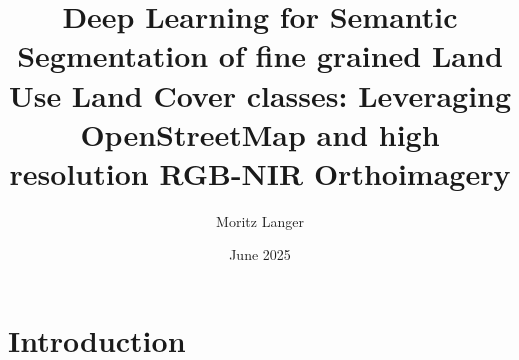 \documentclass{report}
\title{Deep Learning for Semantic Segmentation of fine grained Land Use Land Cover classes: Leveraging OpenStreetMap and high resolution RGB-NIR Orthoimagery}
\author{Moritz Langer}
\date{June 2025}
\begin{document}
\maketitle


\setcounter{tocdepth}{3} %

\tableofcontents

\clearpage

\listoffigures
\listoftables
\clearpage

\setcounter{page}{1}

\makeatletter
{} %
\renewcommand{\thesection}{\arabic{section}} %
\renewcommand{\thesubsection}{\thesection.\arabic{subsection}} %
\renewcommand{\thesubsubsection}{\thesubsection.\arabic{subsubsection}} %
\makeatother
\section{Introduction}
\end{document}
